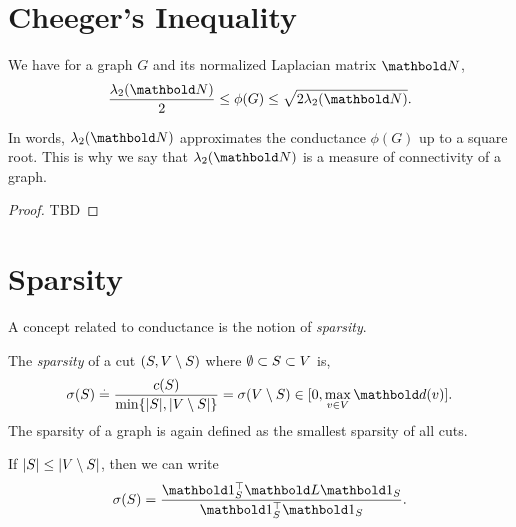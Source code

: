 
\section{Cheeger's Inequality}

\begin{thm} We have for a graph $G$ and its normalized Laplacian matrix $\mN$, \begin{align}
    \frac{\lambda_2(\mN)}{2} \leq \phi(G) \leq \sqrt{2 \lambda_2(\mN)}.
\end{align}
\end{thm}\noindent In words, $\lambda_2(\mN)$ approximates the conductance $\phi(G)$ up to a square root. This is why we say that $\lambda_2(\mN)$ is a measure of connectivity of a graph.

\begin{proof}
TBD
\end{proof}

\section{Sparsity}

A concept related to conductance is the notion of \emph{sparsity}.

\begin{defn}[Sparsity] The \emph{sparsity} of a cut $(S, V \setminus S)$ where $\emptyset \subset S \subset V$ is, \begin{align}
    \sigma(\sS) \defeq \frac{c(\sS)}{\min\{|\sS|, |\sV \setminus \sS|\}} = \sigma(\sV \setminus \sS) \in [0, \max_{v \in \sV} \vd(v)].
\end{align} The sparsity of a graph is again defined as the smallest sparsity of all cuts.
\end{defn}
\begin{rmk}
If $|S| \leq |V \setminus S|$, then we can write \begin{align}
    \sigma(\sS) = \frac{\trans{\vOne_\sS}\mL\vOne_\sS}{\trans{\vOne_\sS}\vOne_\sS}.
\end{align}
\end{rmk}

